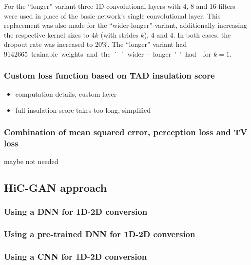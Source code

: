 For the ``longer'' variant three 1D-convolutional layers with 4, 8 and 16 filters 
were used in place of the basic network's single convolutional layer.
This replacement was also made for the ``wider-longer''-variant, 
additionally increasing the respective kernel sizes to $4k$ (with strides $k$), 4 and 4.
In both cases, the dropout rate was increased to 20\%.
The ``longer'' variant had \SI{9142665} trainable weights and the ``wider-longer''
had \xxx for $k=1$.



\subsubsection{Custom loss function based on TAD insulation score}
\begin{itemize}
 \item computation details, custom layer
 \item full insulation score takes too long, simplified
\end{itemize}

\subsubsection{Combination of mean squared error, perception loss and TV loss}
maybe not needed

\subsection{HiC-GAN approach}
\subsubsection{Using a DNN for 1D-2D conversion}
\subsubsection{Using a pre-trained DNN for 1D-2D conversion}
\subsubsection{Using a CNN for 1D-2D conversion}








